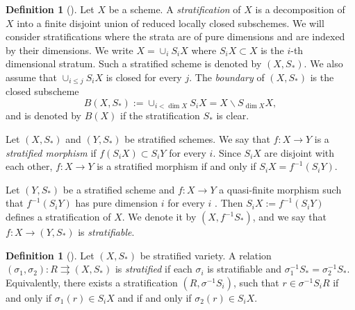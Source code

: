 \documentclass[11pt]{amsart}
\numberwithin{equation}{section}
\theoremstyle{definition}
\newtheorem{defn}[thm]{Definition}
\theoremstyle{definition}
\theoremstyle{definition}
\begin{document}
\begin{defn}[{\cite[Definition 9.15]{Kol13}}] 
Let $X$ be a scheme. A {\it stratification} of $X$ is a decomposition of $X$ into a finite disjoint union of reduced locally closed subschemes. We will consider stratifications where the strata are of pure dimensions
and are indexed by their dimensions. We write $X=\cup_{i}S_iX$ where $S_iX\subset X$ is the $i$-th
dimensional stratum. Such a stratified scheme is denoted by $(X,S_*)$. We also
assume that $\cup_{i\le j}S_iX$ is closed for every $j$. The {\it boundary} of $(X,S_*)$ is the closed subscheme
$$
B(X,S_*):=\cup_{i<\dim X}S_iX=X\backslash S_{\dim X}X,
$$
and is denoted by $B(X)$ if the stratification $S_*$ is clear. 

Let $(X, S_*)$ and $(Y, S_*)$ be stratified schemes. We say that $f: X\to Y$ is a {\it stratified morphism} if $f(S_iX)\subset S_iY$ for every $i$. Since $S_iX$ are disjoint with each other, $f: X\to Y$ is a stratified morphism if and only if $S_iX=f^{-1}(S_iY)$.

Let $(Y, S_*)$ be a stratified scheme and $f:X\to Y$ a quasi-finite morphism such that $f^{-1} (S_iY)$ has pure dimension $i$ for every $i$ . Then $S_iX:=f^{-1}(S_iY)$ defines a stratification of $X$. We denote it by $(X,f^{-1}S_*)$, and we say that $f:X\to(Y,S_*)$ is \emph{stratifiable}.
\end{defn}

\begin{defn}[{\cite[Definition 9.16]{Kol13}}]
Let $(X, S_*)$ be stratified variety. A relation $(\sigma_1,\sigma_2): R\rightrightarrows (X,S_*)$ is {\it stratified} if each $\sigma_i$ is stratifiable and $\sigma_1^{-1}S_*=\sigma_2^{-1}S_*$. Equivalently,
there exists a stratification $(R,\sigma^{-1}S_i)$, such that $r\in\sigma^{-1}S_iR$ if and only if $\sigma_1(r)\in S_iX$ and if and only if $\sigma_2(r)\in S_iX$.
\end{defn}
\end{document}

